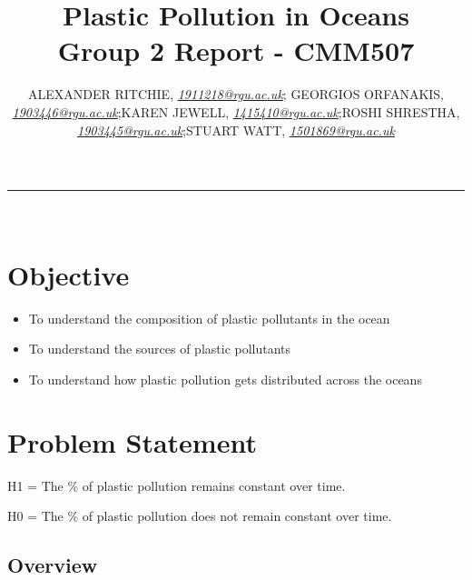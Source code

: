 \documentclass[10pt]{article}\usepackage[]{graphicx}\usepackage[]{color}
\begin{document}
\title{\LARGE Plastic Pollution in Oceans  \\ Group 2 Report - CMM507}

\author{ALEXANDER RITCHIE, \textit{\href{1911218@rgu.ac.uk}{1911218@rgu.ac.uk}}; GEORGIOS ORFANAKIS, \textit{\href{1903446@rgu.ac.uk}{1903446@rgu.ac.uk}};KAREN JEWELL, \textit{\href{1415410@rgu.ac.uk}{1415410@rgu.ac.uk}};ROSHI SHRESTHA, \textit{\href{1903445@rgu.ac.uk}{1903445@rgu.ac.uk}};STUART WATT, \textit{\href{1501869@rgu.ac.uk}{1501869@rgu.ac.uk}}}

\maketitle
\noindent\rule{16cm}{0.4pt}
\ \\

\section*{Objective}


\begin{itemize}
\item To understand the composition of plastic pollutants in the ocean
\item To understand the sources of plastic pollutants
\item To understand how plastic pollution gets distributed across the oceans
\end{itemize}

\section{Problem Statement}\label{statement}

H1 = The \% of plastic pollution remains constant over time.

H0 = The \% of plastic pollution does not remain constant over time.



\subsection{Overview}\label{over}
\end{document}
